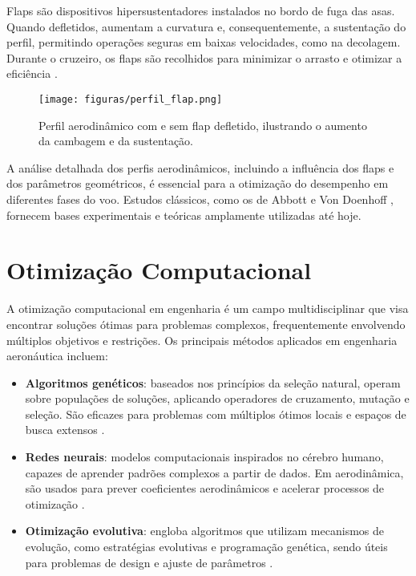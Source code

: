 Flaps são dispositivos hipersustentadores instalados no bordo de fuga das asas. Quando defletidos, aumentam a curvatura e, consequentemente, a sustentação do perfil, permitindo operações seguras em baixas velocidades, como na decolagem. Durante o cruzeiro, os flaps são recolhidos para minimizar o arrasto e otimizar a eficiência \cite{raymer2018aircraft}.

\begin{figure}[H]
    \centering
    \texttt{[image: figuras/perfil\_flap.png]}
    \caption{Perfil aerodinâmico com e sem flap defletido, ilustrando o aumento da cambagem e da sustentação.}
    \label{fig:perfil_flap}
\end{figure}

A análise detalhada dos perfis aerodinâmicos, incluindo a influência dos flaps e dos parâmetros geométricos, é essencial para a otimização do desempenho em diferentes fases do voo. Estudos clássicos, como os de Abbott e Von Doenhoff \cite{abbott1959theory}, fornecem bases experimentais e teóricas amplamente utilizadas até hoje.

\section{Otimização Computacional}
A otimização computacional em engenharia é um campo multidisciplinar que visa encontrar soluções ótimas para problemas complexos, frequentemente envolvendo múltiplos objetivos e restrições. Os principais métodos aplicados em engenharia aeronáutica incluem:

\begin{itemize}
    \item \textbf{Algoritmos genéticos}: baseados nos princípios da seleção natural, operam sobre populações de soluções, aplicando operadores de cruzamento, mutação e seleção. São eficazes para problemas com múltiplos ótimos locais e espaços de busca extensos \cite{goldberg1989genetic}.
    \item \textbf{Redes neurais}: modelos computacionais inspirados no cérebro humano, capazes de aprender padrões complexos a partir de dados. Em aerodinâmica, são usados para prever coeficientes aerodinâmicos e acelerar processos de otimização \cite{goodfellow2016deep}.
    \item \textbf{Otimização evolutiva}: engloba algoritmos que utilizam mecanismos de evolução, como estratégias evolutivas e programação genética, sendo úteis para problemas de design e ajuste de parâmetros \cite{back1996evolutionary}.
\end{itemize}

